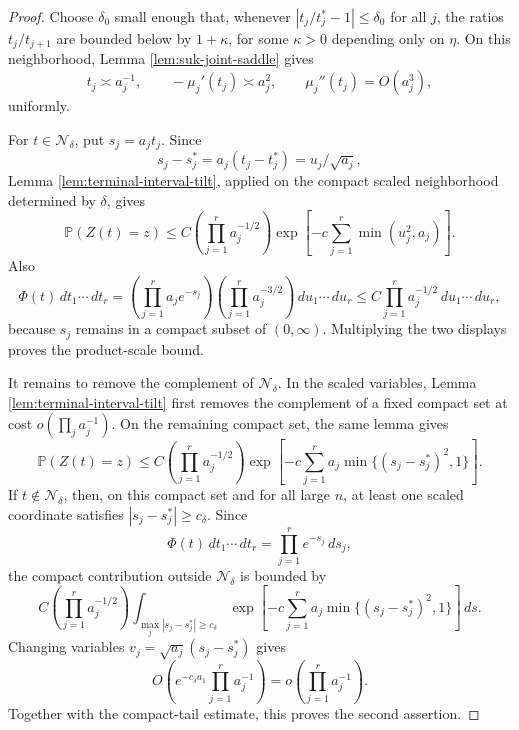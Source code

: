 \documentclass[11pt]{article}
\theoremstyle{remark}
\newcommand{\Pp}{\mathbb P}
\newcommand{\dd}{\,d}
\begin{document}
\begin{proof}
Choose \(\delta_0\) small enough that, whenever
\(|t_j/t_j^*-1|\le\delta_0\) for all \(j\), the ratios
\(t_j/t_{j+1}\) are bounded below by \(1+\kappa\), for some
\(\kappa>0\) depending only on \(\eta\).  On this neighborhood, Lemma \ref{lem:suk-joint-saddle} gives
\[
        t_j\asymp a_j^{-1},\qquad
        -\mu_j'(t_j)\asymp a_j^2,
        \qquad
        \mu_j''(t_j)=O(a_j^3),
\]
uniformly.

For \(t\in\mathcal N_\delta\), put \(s_j=a_jt_j\).  Since
\[
        s_j-s_j^*=a_j(t_j-t_j^*)=u_j/\sqrt{a_j},
\]
Lemma \ref{lem:terminal-interval-tilt}, applied on the compact scaled neighborhood determined by \(\delta\), gives
\[
        \Pp(Z(t)=z)
        \le C\left(\prod_{j=1}^r a_j^{-1/2}\right)
        \exp\left[-c\sum_{j=1}^r\min(u_j^2,a_j)\right].
\]
Also
\[
        \Phi(t)\dd t_1\cdots\dd t_r
        =\left(\prod_{j=1}^r a_j e^{-s_j}\right)
        \left(\prod_{j=1}^r a_j^{-3/2}\right)
        \dd u_1\cdots\dd u_r
        \le C\prod_{j=1}^r a_j^{-1/2}\dd u_1\cdots\dd u_r,
\]
because \(s_j\) remains in a compact subset of \((0,\infty)\).  Multiplying the two displays proves the product-scale bound.

It remains to remove the complement of \(\mathcal N_\delta\).  In the scaled variables, Lemma \ref{lem:terminal-interval-tilt} first removes the complement of a fixed compact set at cost
\(o(\prod_j a_j^{-1})\).  On the remaining compact set, the same lemma gives
\[
        \Pp(Z(t)=z)
        \le C\left(\prod_{j=1}^r a_j^{-1/2}\right)
        \exp\left[-c\sum_{j=1}^r
        a_j\min\{(s_j-s_j^*)^2,1\}\right].
\]
If \(t\notin\mathcal N_\delta\), then, on this compact set and for all large \(n\), at least one scaled coordinate satisfies
\(|s_j-s_j^*|\ge c_\delta\).  Since
\[
        \Phi(t)\dd t_1\cdots\dd t_r
        =\prod_{j=1}^r e^{-s_j}\dd s_j,
\]
the compact contribution outside \(\mathcal N_\delta\) is bounded by
\[
        C\left(\prod_{j=1}^r a_j^{-1/2}\right)
        \int_{\max_j|s_j-s_j^*|\ge c_\delta}
        \exp\left[-c\sum_{j=1}^r
        a_j\min\{(s_j-s_j^*)^2,1\}\right]\dd s .
\]
Changing variables \(v_j=\sqrt{a_j}(s_j-s_j^*)\) gives
\[
        O\left(e^{-c_\delta a_1}\prod_{j=1}^r a_j^{-1}\right)
        =o\left(\prod_{j=1}^r a_j^{-1}\right).
\]
Together with the compact-tail estimate, this proves the second assertion.
\end{proof}
\end{document}
